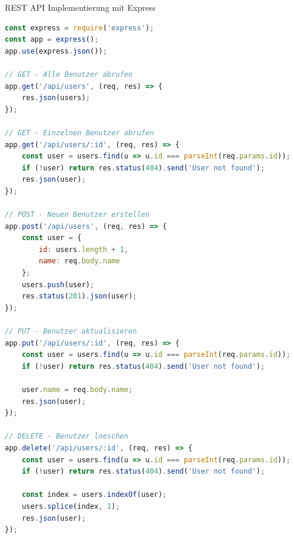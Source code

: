 \begin{KR}{REST API Implementierung mit Express}
\begin{lstlisting}[language=JavaScript, style=basesmol]
const express = require('express');
const app = express();
app.use(express.json());

// GET - Alle Benutzer abrufen
app.get('/api/users', (req, res) => {
    res.json(users);
});

// GET - Einzelnen Benutzer abrufen
app.get('/api/users/:id', (req, res) => {
    const user = users.find(u => u.id === parseInt(req.params.id));
    if (!user) return res.status(404).send('User not found');
    res.json(user);
});

// POST - Neuen Benutzer erstellen
app.post('/api/users', (req, res) => {
    const user = {
        id: users.length + 1,
        name: req.body.name
    };
    users.push(user);
    res.status(201).json(user);
});

// PUT - Benutzer aktualisieren
app.put('/api/users/:id', (req, res) => {
    const user = users.find(u => u.id === parseInt(req.params.id));
    if (!user) return res.status(404).send('User not found');
    
    user.name = req.body.name;
    res.json(user);
});

// DELETE - Benutzer loeschen
app.delete('/api/users/:id', (req, res) => {
    const user = users.find(u => u.id === parseInt(req.params.id));
    if (!user) return res.status(404).send('User not found');
    
    const index = users.indexOf(user);
    users.splice(index, 1);
    res.json(user);
});
\end{lstlisting}
\end{KR}



